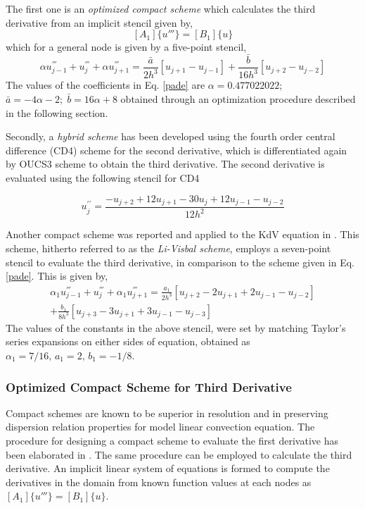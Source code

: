 \documentclass{svjour3}                    %
\begin{document}
The first one is an \textit{optimized compact scheme} which calculates the third derivative from an implicit stencil given by,
\begin{equation*}
\label{matrix}
[A_1]\{u'''\} = [B_1]\{u\}
\end{equation*}
which for a general node is given by a five-point stencil,
\begin{equation}
\label{pade}
\alpha u_{j-1}^{'''} +  u_{j}^{'''} + \alpha u_{j+1}^{'''} 
= \frac{\bar{a}}{2h^3}\left[u_{j+1}-u_{j-1}\right] + \frac{\bar{b}}{16h^3}\left[u_{j+2}-u_{j-2}\right]
\end{equation}
The values of the coefficients in Eq. \eqref{pade} are $\alpha=0.477022022$; $ \bar{a}= -4\alpha-2;\; \bar{b}=16\alpha +8$ obtained through an optimization procedure described in the following section. 

Secondly, a \textit{hybrid scheme} has been developed using the fourth order central difference (CD4) scheme for the second derivative, which is differentiated again by OUCS3 scheme to obtain the third derivative. The second derivative is evaluated using the following stencil for CD4

\begin{equation}
\label{eq:cd4}
u_{j}^{\prime\prime}=\frac{-u_{j+2}+12u_{j+1}-30u_{j}+12u_{j-1}-u_{j-2}}{12h^{2}}
\end{equation}

Another compact scheme was reported and applied to the KdV equation in \cite{Li2006}. This scheme, hitherto referred to as the \textit{Li-Visbal scheme}, employs a seven-point stencil to evaluate the third derivative, in comparison to the scheme given in Eq. \eqref{pade}. This is given by,
\begin{equation}
\begin{aligned}
\label{eq:pade_li}
\alpha_1 u_{j-1}^{'''} +  u_{j}^{'''} + \alpha_1 u_{j+1}^{'''} 
= \frac{a_1}{2h^3}\left[u_{j+2}-2u_{j+1}+2u_{j-1}- u_{j-2}\right] \\
+ \frac{b_1}{8h^3}\left[u_{j+3}-3u_{j+1}+3u_{j-1}- u_{j-3}\right]
\end{aligned}
\end{equation}
The values of the constants in the above stencil, were set by matching Taylor's series expansions on either sides of equation, obtained as 
$\alpha_1 = 7/16,\,a_1= 2,\,b_1=-1/8$. 

\subsubsection{Optimized Compact Scheme for Third Derivative}
\label{subsec:OCS}
Compact schemes are known to be superior in resolution and in preserving dispersion relation properties for model linear convection equation. The procedure for designing a compact scheme to evaluate the first derivative has been elaborated in \cite{Sengupta2013a,Sengupta2006b}. The same procedure can be employed to calculate the third derivative. An implicit linear system of equations is formed to compute the derivatives in the domain from known function values at each nodes as $[A_1]\{u'''\} = [B_1]\{u\}$.
\end{document}
